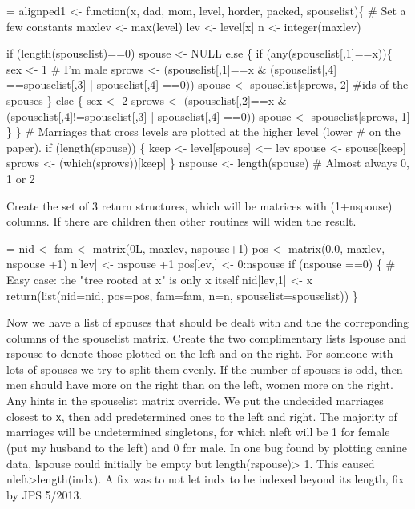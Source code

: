 \documentclass{article}
\begin{document}
\begin{nwchunk}
=
 alignped1 <- function(x, dad, mom, level, horder, packed, spouselist)\{
     # Set a few constants
     maxlev <- max(level)
     lev <- level[x]
     n <- integer(maxlev)
 
     if (length(spouselist)==0)  spouse <- NULL
     else \{
         if (any(spouselist[,1]==x))\{
             sex <- 1                                  # I'm male
             sprows <- (spouselist[,1]==x & (spouselist[,4] ==spouselist[,3] |
                                             spouselist[,4] ==0))
             spouse <- spouselist[sprows, 2] #ids of the spouses
             \}
         else \{
             sex <- 2
             sprows <- (spouselist[,2]==x & (spouselist[,4]!=spouselist[,3] |
                                             spouselist[,4] ==0))
             spouse <- spouselist[sprows, 1]
             \}
         \}
     # Marriages that cross levels are plotted at the higher level (lower
     #  on the paper).
     if (length(spouse)) \{
         keep <- level[spouse] <= lev
         spouse <- spouse[keep]
         sprows <- (which(sprows))[keep]
         \}
     nspouse <- length(spouse)  # Almost always 0, 1 or 2
\end{nwchunk}
Create the set of 3 return structures, which will be matrices with
(1+nspouse) columns.
If there are children then other routines will widen the result.
\begin{nwchunk}
=
     nid <- fam <- matrix(0L, maxlev, nspouse+1)
     pos <- matrix(0.0, maxlev, nspouse +1)
     n[lev] <- nspouse +1       
     pos[lev,] <- 0:nspouse
     if (nspouse ==0) \{   
         # Easy case: the "tree rooted at x" is only x itself
         nid[lev,1] <- x
         return(list(nid=nid, pos=pos, fam=fam, n=n, spouselist=spouselist))
         \}
\end{nwchunk}
Now we have a list of spouses that should be dealt with and 
the the correponding columns of the spouselist matrix.  
Create the two complimentary lists lspouse and rspouse to denote
those plotted on the left and on the right.  
For someone with lots of spouses we try to split them evenly.
If the number of spouses is odd, then men should have more on the
right than on the left, women more on the right.
Any hints in the spouselist matrix override.
We put the undecided marriages closest to \Verb!x!, 
then add predetermined ones to the left and
right.
The majority of marriages will be undetermined singletons, for which
nleft will be 1 for female (put my husband to the left) and 0 for male.
In one bug found by plotting canine data, lspouse could initially be empty but 
length(rspouse)> 1. This caused nleft>length(indx). A fix was to not let
indx to be indexed beyond its length, fix by JPS 5/2013.
\end{document}
